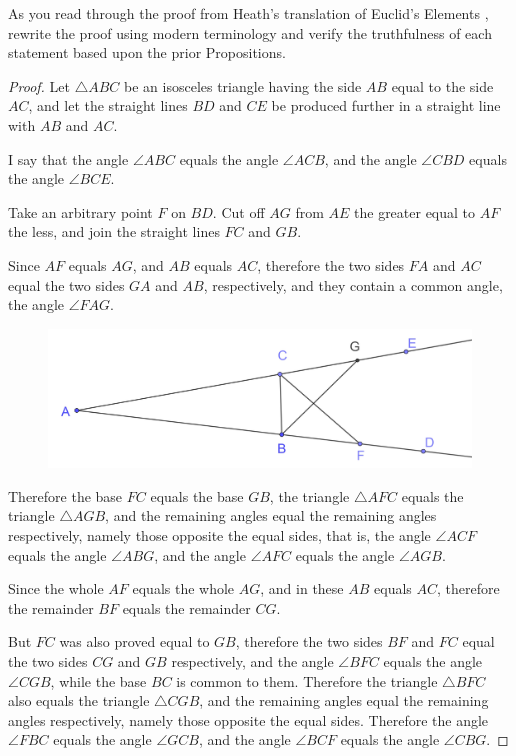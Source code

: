 \documentclass[
]{book}
\theoremstyle{definition}
\theoremstyle{definition}
\theoremstyle{definition}
\theoremstyle{definition}
\theoremstyle{remark}
\begin{document}
As you read through the proof from Heath's translation of Euclid's Elements \citeyearpar[p.~251]{Heath1908_1}, rewrite the proof using modern terminology and verify the truthfulness of each statement based upon the prior Propositions.

\begin{proof}
Let \(\triangle ABC\) be an isosceles triangle having the side \(AB\) equal to the side \(AC\), and let the straight lines \(BD\) and \(CE\) be produced further in a straight line with \(AB\) and \(AC\).

I say that the angle \(\angle ABC\) equals the angle \(\angle ACB\), and the angle \(\angle CBD\) equals the angle \(\angle BCE\).

Take an arbitrary point \(F\) on \(BD\). Cut off \(AG\) from \(AE\) the greater equal to \(AF\) the less, and join the straight lines \(FC\) and \(GB\).

Since \(AF\) equals \(AG\), and \(AB\) equals \(AC\), therefore the two sides \(FA\) and \(AC\) equal the two sides \(GA\) and \(AB\), respectively, and they contain a common angle, the angle \(\angle FAG\).

\begin{figure}

{\centering \includegraphics[width=0.7\linewidth]{images/Prop5} 

}

\end{figure}

Therefore the base \(FC\) equals the base \(GB\), the triangle \(\triangle AFC\) equals the triangle \(\triangle AGB\), and the remaining angles equal the remaining angles respectively, namely those opposite the equal sides, that is, the angle \(\angle ACF\) equals the angle \(\angle ABG\), and the angle \(\angle AFC\) equals the angle \(\angle AGB\).

Since the whole \(AF\) equals the whole \(AG\), and in these \(AB\) equals \(AC\), therefore the remainder \(BF\) equals the remainder \(CG\).

But \(FC\) was also proved equal to \(GB\), therefore the two sides \(BF\) and \(FC\) equal the two sides \(CG\) and \(GB\) respectively, and the angle \(\angle BFC\) equals the angle \(\angle CGB\), while the base \(BC\) is common to them. Therefore the triangle \(\triangle BFC\) also equals the triangle \(\triangle CGB\), and the remaining angles equal the remaining angles respectively, namely those opposite the equal sides. Therefore the angle \(\angle FBC\) equals the angle \(\angle GCB\), and the angle \(\angle BCF\) equals the angle \(\angle CBG\).


\end{proof}
\end{document}
